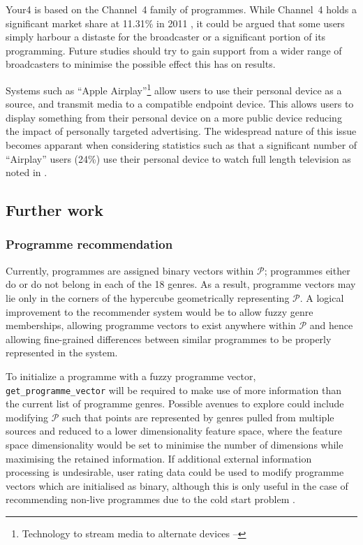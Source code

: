 	Your4 is based on the Channel~4 family of programmes. While Channel~4 holds a significant market share at 11.31\% in 2011 \citep{barb-trends}, it could be argued that some users simply harbour a distaste for the broadcaster or a significant portion of its programming. Future studies should try to gain support from a wider range of broadcasters to minimise the possible effect this has on results.

	Systems such as ``Apple Airplay''\footnote{Technology to stream media to alternate devices -- } allow users to use their personal device as a source, and transmit media to a compatible endpoint device. This allows users to display something from their personal device on a more public device reducing the impact of personally targeted advertising. The widespread nature of this issue becomes apparant when considering statistics such as that a significant number of ``Airplay'' users (24\%) use their personal device to watch full length television as noted in \citet{viacom}.

	\subsection{Further work}
		\subsubsection{Programme recommendation}
		\label{sec:further_work_recommender}

		Currently, programmes are assigned binary vectors within $\mathcal{P}$; programmes either do or do not belong in each of the 18 genres. As a result, programme vectors may lie only in the corners of the hypercube geometrically representing $\mathcal{P}$. A logical improvement to the recommender system would be to allow fuzzy genre memberships, allowing programme vectors to exist anywhere within $\mathcal{P}$ and hence allowing fine-grained differences between similar programmes to be properly represented in the system.
		
		To initialize a programme with a fuzzy programme vector, \texttt{get\_programme\_vector} will be required to make use of more information than the current list of programme genres. Possible avenues to explore could include modifying $\mathcal{P}$ such that points are represented by genres pulled from multiple sources and reduced to a lower dimensionality feature space, where the feature space dimensionality would be set to minimise the number of dimensions while maximising the retained information. If additional external information processing is undesirable, user rating data could be used to modify programme vectors which are initialised as binary, although this is only useful in the case of recommending non-live programmes due to the cold start problem \citep{cold-start-problem}.

